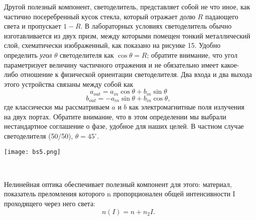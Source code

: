 \begin{multicols}{2}
{        Другой полезный компонент, светоделитель, представляет собой не что иное, как частично посеребренный
        кусок стекла, который отражает долю $R$ падающего света и пропускает $1-R$. В
        лабораторных условиях светоделитель обычно изготавливается из двух призм,
        между которыми помещен тонкий металлический слой, схематически изображенный, как показано на рисунке 15. Удобно
        определить \emph{угол} $\theta$ светоделителя как $\cos{\theta} = R$; обратите внимание, что угол параметризует
        величину частичного отражения и не обязательно имеет какое-либо отношение к
        физической ориентации светоделителя. Два входа и два выхода этого устройства
        связаны между собой как
        \begin{equation}
            a_{out}=a_{in}\cos{\theta}+b_{in}\sin{\theta}
        \end{equation}
        \begin{equation}
            b_{out}=-a_{in}\sin{\theta}+b_{in}\cos{\theta},
        \end{equation}
        где классически мы рассматриваем $a$ и $b$ как электромагнитные поля излучения на
        двух портах. Обратите внимание, что в этом определении мы выбрали нестандартное соглашение о фазе, удобное для наших целей. В частном случае светоделителя (50/50), $\theta=45^\circ$.
        }\\
        \begin{flushleft}
            \begin{minipage}{0.3\textwidth}{\texttt{[image: bs5.png]}}
            \end{minipage}\\
            \vspace{0.3cm}
        \end{flushleft}
    \normalsize{
        Нелинейная оптика обеспечивает полезный компонент для этого: материал, показатель преломления которого n пропорционален общей интенсивности I проходящего через
        него света:
        \begin{equation}
            n(I)=n+n_2I.
        \end{equation}
        
}
\end{multicols}
